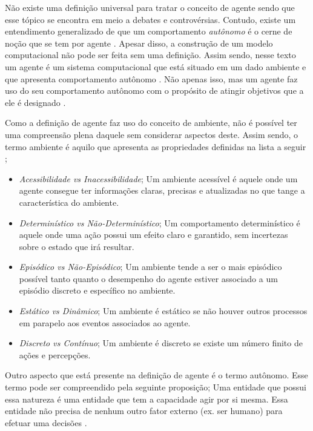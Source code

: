 Não existe uma definição universal para tratar o conceito de agente sendo que esse tópico se encontra em meio a debates e controvérsias. Contudo, existe um entendimento generalizado de que um comportamento \textit{autônomo} é o cerne de noção que se tem por agente \cite{whatisagent}. Apesar disso, a construção de um modelo computacional não pode ser feita sem uma definição. Assim sendo, nesse texto um agente é um sistema computacional que está situado em um dado ambiente e que apresenta comportamento autônomo \cite{whatisagent} \cite{whatisagent}. Não apenas isso, mas um agente faz uso do seu comportamento autônomo com o propósito de atingir objetivos que a ele é designado \cite{whatisagent}.

Como a definição de agente faz uso do conceito de ambiente, não é possível ter uma compreensão plena daquele sem considerar aspectos deste. Assim sendo, o termo ambiente  é aquilo que apresenta as propriedades definidas na lista a seguir \cite{artificialinteligencemodermapproach} \cite{whatisagent}; 
\begin{itemize}
    \item \textit{Acessibilidade vs Inacessibilidade}; Um ambiente acessível é aquele onde um agente consegue ter informações claras, precisas e atualizadas no que tange a característica do ambiente.
    \item \textit{Determinístico vs Não-Determinístico}; Um comportamento determinístico é aquele onde uma ação possui um efeito claro e garantido, sem incertezas sobre o estado que irá resultar.
    \item \textit{Episódico vs Não-Episódico}; Um ambiente tende a ser o mais episódico possível tanto quanto o desempenho do agente estiver associado a um episódio discreto e específico no ambiente.
    \item \textit{Estático vs Dinâmico}; Um ambiente é estático se não houver outros processos em parapelo aos eventos associados ao agente.
    \item \textit{Discreto vs Contínuo}; Um ambiente é discreto se existe um número finito de ações e percepções. 
\end{itemize}

Outro aspecto que está presente na definição de agente é o termo autônomo. Esse termo pode ser compreendido pela seguinte proposição; Uma entidade que possui essa natureza é uma entidade que tem a capacidade agir por si mesma. Essa entidade não precisa de nenhum outro fator externo (ex. ser humano) para efetuar uma decisões \cite{whatisagent}.

